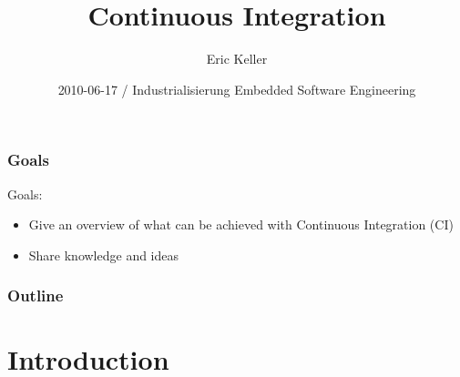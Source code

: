\documentclass[handout]{beamer}
\title[Industrialisierung Embedded Software Engineering: CI]{Continuous
Integration}
\author{Eric Keller}
\institute[HAMILTON-Medical AG]
{
HAMILTON-Medical AG\\
}
\date{2010-06-17 / Industrialisierung Embedded Software Engineering}
\begin{document}
\begin{frame}
\titlepage
\end{frame}

\begin{frame}
\frametitle{Goals}
Goals:
\begin{itemize}
  \item<1-> Give an overview of what can be achieved with Continuous Integration
  (CI)
  \item<2-> Share knowledge and ideas
\end{itemize}
\end{frame}

\begin{frame}
\frametitle{Outline}
\tableofcontents[pausesections]
\end{frame}


\section{Introduction}
\end{document}
